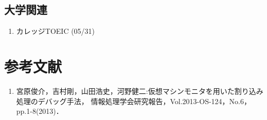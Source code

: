 \documentclass[fleqn, 14pt]{extarticle}
\begin{document}
\subsection{大学関連}
\begin{enumerate}
\item カレッジTOEIC
\hfill
\label{enum-8}
(05/31)
\end{enumerate}

\section{参考文献}
\renewcommand{\labelenumi}{[\arabic{enumi}]}
\begin{enumerate}
\item 宮原俊介，吉村剛，山田浩史，河野健二:仮想マシンモニタを用いた割り込み処理のデバッグ手法，
情報処理学会研究報告，Vol.2013-OS-124，No.6，pp.1-8(2013)．
\end{enumerate}
\end{document}
